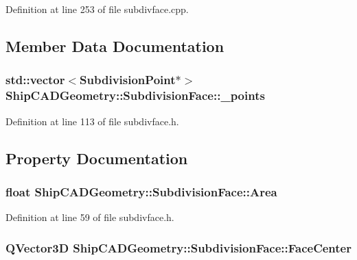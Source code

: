 Definition at line 253 of file subdivface.\-cpp.



\subsection{Member Data Documentation}
\hypertarget{classShipCADGeometry_1_1SubdivisionFace_a1442d01623618d3bd3d231ac2f61bdf2}{
\subsubsection[{\-\_\-points}]{\setlength{\rightskip}{0pt plus 5cm}std\-::vector$<${\bf Subdivision\-Point}$\ast$$>$ Ship\-C\-A\-D\-Geometry\-::\-Subdivision\-Face\-::\-\_\-points\hspace{0.3cm}{\ttfamily [protected]}}}\label{classShipCADGeometry_1_1SubdivisionFace_a1442d01623618d3bd3d231ac2f61bdf2}


Definition at line 113 of file subdivface.\-h.



\subsection{Property Documentation}
\hypertarget{classShipCADGeometry_1_1SubdivisionFace_a19d38604a7e9f14c927c59616bb3b8a5}{
\subsubsection[{Area}]{\setlength{\rightskip}{0pt plus 5cm}float Ship\-C\-A\-D\-Geometry\-::\-Subdivision\-Face\-::\-Area\hspace{0.3cm}{\ttfamily [read]}}}\label{classShipCADGeometry_1_1SubdivisionFace_a19d38604a7e9f14c927c59616bb3b8a5}


Definition at line 59 of file subdivface.\-h.

\hypertarget{classShipCADGeometry_1_1SubdivisionFace_a4ceab979e8faacf6c8c10420fb720080}{
\subsubsection[{Face\-Center}]{\setlength{\rightskip}{0pt plus 5cm}Q\-Vector3\-D Ship\-C\-A\-D\-Geometry\-::\-Subdivision\-Face\-::\-Face\-Center\hspace{0.3cm}{\ttfamily [read]}}}\label{classShipCADGeometry_1_1SubdivisionFace_a4ceab979e8faacf6c8c10420fb720080}


